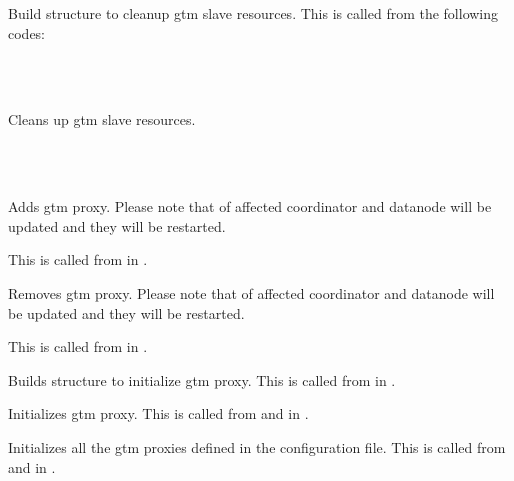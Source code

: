       Build  structure to cleanup gtm slave resources.
      This is called from the following codes:
      
      \FuncRefHdr
		  \vspace{-10pt} \\ 
		  \vspace{-10pt} \\ \hline
      \FuncRefTrailor
  
  
      Cleans up gtm slave resources.
      
      \FuncRefHdr
		  \vspace{-10pt} \\ 
		  \vspace{-10pt} \\ \hline
      \FuncRefTrailor
  
  
      Adds gtm proxy.
      Please note that  of affected coordinator and datanode will be
	  updated and they will be restarted.
      
      This is called from  in .
  
  
      Removes gtm proxy.
      Please note that  of affected coordinator and datanode will be
	  updated and they will be restarted.
      
      This is called from  in .
  
  
      Builds  structure to initialize gtm proxy.
      This is called from  in .
  
  
      Initializes gtm proxy.
      This is called from  and  in .
  
  
      Initializes all the gtm proxies defined in the configuration file.
      This is called from  and  in .
  
